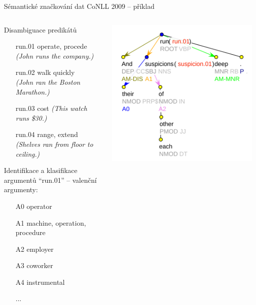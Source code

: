 \documentclass[hyperref={unicode=true}]{beamer}
\begin{document}
\begin{frame}{Sémantické značkování dat CoNLL 2009 -- příklad}
    \begin{columns}
    \begin{column}{0.6\textwidth}
    \begin{block}{Disambiguace predikátů}
    \begin{itemize}\scriptsize\setlength{\itemindent}{1em}
        \item[run.01] operate, procede \textit{(John runs the company.)}
        \item[run.02] walk quickly \\ \textit{(John ran the Boston Marathon.)}
        \item[run.03] cost \textit{(This watch runs \$30.)}
        \item[run.04] range, extend \\ \textit{(Shelves ran from floor to ceiling.)}
    \end{itemize}
    \end{block}
    \begin{block}{Identifikace a klasifikace argumentů}
    \scriptsize "`run.01"' -- valenční argumenty:
    \begin{itemize}\scriptsize
      \item[A0] operator
      \item[A1] machine, operation, procedure
      \item[A2] employer
      \item[A3] coworker
      \item[A4] instrumental
      \item[...] 
    \end{itemize}
    \end{block}
    \end{column}
    \begin{column}{0.4\textwidth}
    \begin{center}
    \scriptsize
    \includegraphics[width=\textwidth]{example-sentence} \\

\end{center}
\end{column}
\end{columns}
\end{frame}
\end{document}
